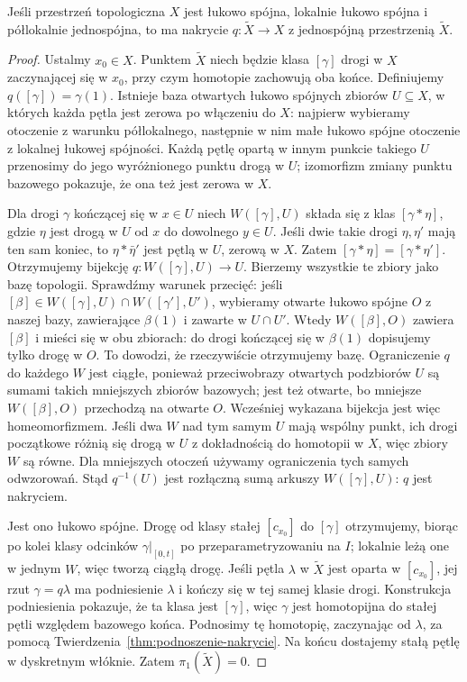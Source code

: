 \begin{twierdzenie}
\label{thm:uniwersalne-nakrycie}
Jeśli przestrzeń topologiczna $X$ jest łukowo spójna,
lokalnie łukowo spójna i półlokalnie jednospójna,
to ma nakrycie $q:\widetilde X\to X$
z jednospójną przestrzenią $\widetilde X$.
\end{twierdzenie}
\begin{proof}
Ustalmy $x_0\in X$. Punktem $\widetilde X$
niech będzie klasa $[\gamma]$ drogi w $X$
zaczynającej się w $x_0$, przy czym
homotopie zachowują oba końce.
Definiujemy $q([\gamma])=\gamma(1)$.
Istnieje baza otwartych łukowo spójnych
zbiorów $U\subseteq X$, w których
każda pętla jest zerowa po włączeniu do $X$:
najpierw wybieramy otoczenie z warunku
półlokalnego, następnie w nim małe
łukowo spójne otoczenie z lokalnej
łukowej spójności. Każdą pętlę opartą w innym punkcie
takiego $U$ przenosimy do jego wyróżnionego punktu drogą w $U$;
izomorfizm zmiany punktu bazowego pokazuje, że ona też jest zerowa w $X$.

Dla drogi $\gamma$ kończącej się w $x\in U$
niech $W([\gamma],U)$ składa się z klas
$[\gamma*\eta]$, gdzie $\eta$ jest drogą
w $U$ od $x$ do dowolnego $y\in U$.
Jeśli dwie takie drogi $\eta,\eta'$
mają ten sam koniec, to
$\eta*\bar\eta'$ jest pętlą w $U$,
zerową w $X$. Zatem $[\gamma*\eta]
=[\gamma*\eta']$. Otrzymujemy bijekcję
$q:W([\gamma],U)\to U$. Bierzemy wszystkie
te zbiory jako bazę topologii. Sprawdźmy warunek przecięć:
jeśli $[\beta]\in W([\gamma],U)\cap W([\gamma'],U')$,
wybieramy otwarte łukowo spójne $O$ z naszej bazy,
zawierające $\beta(1)$ i zawarte w $U\cap U'$.
Wtedy $W([\beta],O)$ zawiera $[\beta]$ i mieści się w obu zbiorach:
do drogi kończącej się w $\beta(1)$ dopisujemy tylko drogę w $O$.
To dowodzi, że rzeczywiście otrzymujemy bazę.
Ograniczenie $q$ do każdego $W$ jest ciągłe, ponieważ przeciwobrazy
otwartych podzbiorów $U$ są sumami takich mniejszych zbiorów bazowych;
jest też otwarte, bo mniejsze $W([\beta],O)$ przechodzą na otwarte $O$.
Wcześniej wykazana bijekcja jest więc homeomorfizmem.
Jeśli dwa $W$ nad tym samym
$U$ mają wspólny punkt, ich drogi początkowe
różnią się drogą w $U$ z dokładnością
do homotopii w $X$, więc zbiory $W$
są równe. Dla mniejszych otoczeń
używamy ograniczenia tych samych odwzorowań.
Stąd $q^{-1}(U)$ jest rozłączną sumą
arkuszy $W([\gamma],U)$: $q$ jest nakryciem.

Jest ono łukowo spójne. Drogę od klasy
stałej $[c_{x_0}]$ do $[\gamma]$
otrzymujemy, biorąc po kolei klasy
odcinków $\gamma|_{[0,t]}$ po
przeparametryzowaniu na $I$; lokalnie
leżą one w jednym $W$, więc tworzą
ciągłą drogę. Jeśli pętla
$\lambda$ w $\widetilde X$ jest oparta
w $[c_{x_0}]$, jej rzut $\gamma=q\lambda$
ma podniesienie $\lambda$ i kończy
się w tej samej klasie drogi.
Konstrukcja podniesienia pokazuje,
że ta klasa jest $[\gamma]$, więc
$\gamma$ jest homotopijna do stałej
pętli względem bazowego końca.
Podnosimy tę homotopię, zaczynając
od $\lambda$, za pomocą
Twierdzenia~\ref{thm:podnoszenie-nakrycie}.
Na końcu dostajemy stałą pętlę
w dyskretnym włóknie. Zatem
$\pi_1(\widetilde X)=0$.
\end{proof}

